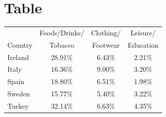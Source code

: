\documentclass[titlepage]{article} %
\begin{document}
\section{Table}
\begin{table}[ht]
		\centering
		\def\arraystretch{1.5} %
		\begin{tabular}{|l|c|c|c|}
			\hline
				\cellcolor[gray]{.8} & \cellcolor[gray]{.8}Foods/Drinks/ & \cellcolor[gray]{.8}Clothing/ & \cellcolor[gray]{.8}Leisure/ \\
				\multirow{-2}{*}{\cellcolor[gray]{.8}Country} &
				\cellcolor[gray]{0.8}Tobacco & \cellcolor[gray]{0.8}Footwear & \cellcolor[gray]{0.8}Education\\ 
	
				\hline \cellcolor[gray]{.8}Ireland  & 28.91\% & 6.43\% & 2.21\%\\
				\hline \cellcolor[gray]{.8}Italy 	& 16.36\% & 9.00\% & 3.20\%\\
				\hline \cellcolor[gray]{.8}Spain 	& 18.80\% & 6.51\% & 1.98\%\\
				\hline \cellcolor[gray]{.8}Sweden	& 15.77\% & 5.40\% & 3.22\%\\
				\hline \cellcolor[gray]{.8}Turkey 	& 32.14\% & 6.63\% & 4.35\%\\
			\hline
		\end{tabular}
\end{table}
\end{document}
